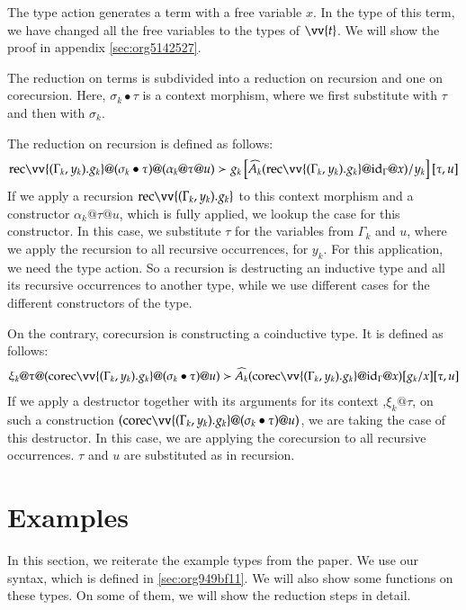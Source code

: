 \documentclass[a4paper,cleardoubleempty,BCOR1cm]{scrbook}
\begin{document}
The type action generates a term with a free variable \(x\).  In the type of
this term, we have changed all the free variables to the types of \(\vv{t}\).
We will show the proof in appendix \ref{sec:org5142527}.

The reduction on terms  is subdivided into a reduction on recursion and one
on corecursion. Here, \(\sigma_k \bullet\tau\) is a context morphism, where we
first substitute with \(\tau\) and then with \(\sigma_k\).

The reduction on recursion is defined as follows:
\begin{align*}
  \rec \vv{(\Gamma_k,y_k).g_k}@(\sigma_k\bullet\tau)@(\alpha_k@\tau@u)\succ g_k\left[ \widehat{A_k}(\rec\vv{(\Gamma_k,y_k).g_k}@\id{\Gamma}@x)/y_k \right][\tau,u]\\
\end{align*}
If we apply a recursion \(\rec \vv{(\Gamma_k,y_k).g_k}\) to this context
morphism and a constructor \(\alpha_k@\tau@u\), which is fully applied, we
lookup the case for this constructor. In this case, we substitute \(\tau\) for
the variables from \(\Gamma_k\) and \(u\), where we apply the recursion to all
recursive occurrences, for \(y_k\). For this application, we need the type
action. So a recursion is destructing an inductive type and all its recursive
occurrences to another type, while we use different cases for the different
constructors of the type.

On the contrary, corecursion is constructing a coinductive type. It is defined
as follows:
\begin{align*}
  \xi_k@\tau@(\corec \vv{(\Gamma_k,y_k).g_k}@(\sigma_k\bullet\tau)@u)\succ \widehat{A_k}(\corec\vv{(\Gamma_k,y_k).g_k}@\id{\Gamma}@x)[g_k/x] [\tau,u]
\end{align*}
If we apply a destructor together with its arguments for its context
,\(\xi_k@\tau\), on such a construction \((\corec
   \vv{(\Gamma_k,y_k).g_k}@(\sigma_k\bullet\tau)@u)\), we are taking the case of
this destructor. In this case, we are applying the corecursion to all
recursive occurrences. \(\tau\) and \(u\) are substituted as in recursion.

\chapter{Examples}
\label{sec:orgff2417f}

In this section, we reiterate the example types from the paper.  We use our
syntax, which is defined in \ref{sec:org949bf11}.  We will also show some functions
on these types.  On some of them, we will show the reduction steps in detail.
\end{document}
